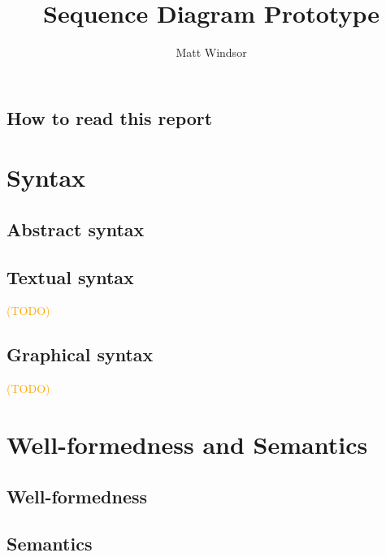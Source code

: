 \documentclass[a4paper]{memoir}
\title{\langname{} Sequence Diagram Prototype}
\author{Matt Windsor}
\newcommand{\todo}[1]{\textcolor{orange}{(#1)}}
\theoremstyle{definition}
\begin{document}
\pagestyle{sruled}

\frontmatter

\begin{titlingpage}
\setlength{\droptitle}{30pt}
\maketitle
\end{titlingpage}

\tableofcontents{}

\clearpage

\chapter*{How to read this report}


\mainmatter

\part{Syntax}

\chapter{Abstract syntax}\label{cha:metamodel}


\chapter{Textual syntax}\label{cha:textual}
\todo{TODO}

\chapter{Graphical syntax}\label{cha:graphical}
\todo{TODO}

\part{Well-formedness and Semantics}

\chapter{Well-formedness}\label{cha:wf}


\chapter{Semantics}\label{cha:semantics}




\end{document}
